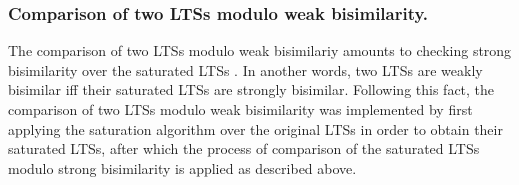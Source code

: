 \subsubsection{Comparison of two LTSs modulo weak bisimilarity.}
The comparison of two LTSs modulo weak bisimilariy amounts to checking strong bisimilarity over the saturated LTSs \cite{ReactiveSystems4}. In another words, two LTSs are weakly bisimilar iff their saturated LTSs are strongly bisimilar. Following this fact, the comparison of two LTSs modulo weak bisimilarity was implemented by first applying the saturation algorithm over the original LTSs in order to obtain their saturated LTSs, after which the process of comparison of the saturated LTSs modulo strong bisimilarity is applied as described above.